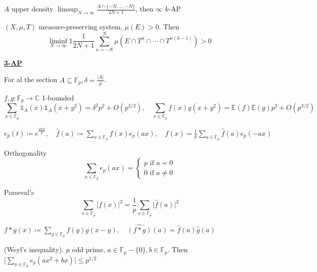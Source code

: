 \begin{theorem}[Szemeredi, 1975] 
$A$ upper density $ \limsup_{N \to \infty} \frac{A \cap \{ -N, \ldots, -N \}}{2N+1}$, then $ \infty$ $k$-AP
\end{theorem}

\begin{theorem}[Furstenberg, 1977]
$(X, \mu , T)$ measure-preserving system, $\mu (E) > 0$. Then
\[
\liminf_{N \to \infty} 1\frac{1}{2N+1} \sum_{n = -N} ^{N} \mu (E \cap T^n \cap \cdots  \cap T^{n(k-1)}) >0
\]
\end{theorem}

\underline{\textbf{3-AP}}   

For al the section $A \subseteq \mathbb{F}_p, \delta = \frac{\lvert A \rvert }{p}$.

\begin{theorem} $f, g: \mathbb{F}_p \to \mathbb{C}$ 1-bounded
\[
\sum_{x \in \mathbb{F}_p} \mathds{1} _A(x) \mathds{1}_A(x + y^2) = \delta ^2 p^2 + O(p^{3 / 2}), \quad 
\sum_{x \in \mathbb{F}_p} f(x) g(x + y ^2) = \mathbb{E}(f)\mathbb{E}(g)p^2 + O(p^{3 / 2})
\]
\end{theorem}

\begin{definition}
$e_p(t) \coloneqq  e ^{\frac{2\pi i t}{p}}, \quad  \hat{f}(a) \coloneqq \sum_{x \in \mathbb{F}_p} f(x) e_p(ax), \quad f(x) = \frac{1}{p} \sum_{a \in \mathbb{F}_p} \hat{f}(a) e_p(-ax)$
\end{definition}

\begin{proposition} Orthogonality
\[
\sum_{x \in \mathbb{F}_p} e_p(ax) = 
\begin{cases}
p \text{ if } a = 0 \\
0 \text{ if } a \neq 0
\end{cases}
\]
\end{proposition}

\begin{proposition} Parseval's
\[
\sum_{x \in \mathbb{F}_p} \lvert f(x) \rvert^2 = \frac{1}{p} \sum_{x \in \mathbb{F}_p} \lvert \hat{f}(a) \rvert^2
\]
\end{proposition}

\begin{definition}[Convolution]
$f * g (x) \coloneqq \sum_{y \in \mathbb{F}_p} f(y)g(x-y), \quad  \hat{(f*g)}(a) = \hat{f}(a) \hat{g}(a)$
\end{definition}

\begin{proposition} (Weyl's inequality). $p$ odd prime, $a \in \mathbb{F}_p-\{0\}, b \in \mathbb{F}_p$. Then
$\lvert \sum_{x \in \mathbb{F}_p} e_p(a x^2 + bx) \rvert \leq p^{1/2}$
\end{proposition}